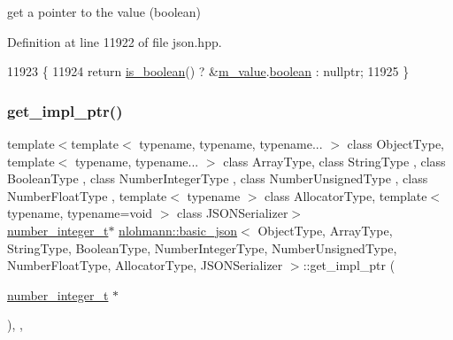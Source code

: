 get a pointer to the value (boolean) 



Definition at line 11922 of file json.\+hpp.


\begin{DoxyCode}
11923     \{
11924         \textcolor{keywordflow}{return} \hyperlink{classnlohmann_1_1basic__json_a943e8cb182d0f2365c76d64b42eaa6fd}{is\_boolean}() ? &\hyperlink{classnlohmann_1_1basic__json_aeb0814f76966f99290cb29e127c90a77}{m\_value}.\hyperlink{unionnlohmann_1_1basic__json_1_1json__value_afd0f8ec00c40301efffd01a276959371}{boolean} : \textcolor{keyword}{nullptr};
11925     \}
\end{DoxyCode}
\mbox{\label{classnlohmann_1_1basic__json_a32a4c3ccdd09b663614adce1834a0a50}} 
\subsubsection{\texorpdfstring{get\+\_\+impl\+\_\+ptr()}{get\_impl\_ptr()}\hspace{0.1cm}{\footnotesize\ttfamily [9/14]}}
{\footnotesize\ttfamily template$<$template$<$ typename, typename, typename... $>$ class Object\+Type, template$<$ typename, typename... $>$ class Array\+Type, class String\+Type , class Boolean\+Type , class Number\+Integer\+Type , class Number\+Unsigned\+Type , class Number\+Float\+Type , template$<$ typename $>$ class Allocator\+Type, template$<$ typename, typename=void $>$ class J\+S\+O\+N\+Serializer$>$ \\
\hyperlink{classnlohmann_1_1basic__json_a98e611d67b7bd75307de99c9358ab2dc}{number\+\_\+integer\+\_\+t}$\ast$ \hyperlink{classnlohmann_1_1basic__json}{nlohmann\+::basic\+\_\+json}$<$ Object\+Type, Array\+Type, String\+Type, Boolean\+Type, Number\+Integer\+Type, Number\+Unsigned\+Type, Number\+Float\+Type, Allocator\+Type, J\+S\+O\+N\+Serializer $>$\+::get\+\_\+impl\+\_\+ptr (\begin{DoxyParamCaption}\item[{\hyperlink{classnlohmann_1_1basic__json_a98e611d67b7bd75307de99c9358ab2dc}{number\+\_\+integer\+\_\+t} $\ast$}]{ }\end{DoxyParamCaption})\hspace{0.3cm}{\ttfamily [inline]}, {\ttfamily [private]}, {\ttfamily [noexcept]}}



